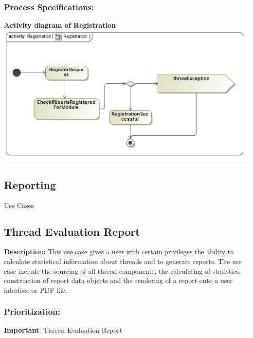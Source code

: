 \documentclass[a4paper,11pt]{article}
\begin{document}
\subsubsection{Process Specifications:} 
\textbf{Activity diagram of Registration}\\ 
\includegraphics[width=1\linewidth]{./Images/Author/RegistrationAct.jpg}\\

\newpage
\begin{center}
\section{\textbf{\huge{Reporting}}}
\Large{Use Cases}
\end{center}

\subsection{Thread Evaluation Report}
\textbf{Description:}
This use case gives a user with certain privileges the ability to calculate statistical information about threads and to generate reports. The use case include the sourcing of all thread components, the calculating of statistics, construction of report data objects and the rendering of a report onto a user interface or PDF file.
\subsubsection{Prioritization:} 
\textbf{Important}: Thread Evaluation Report
\end{document}
